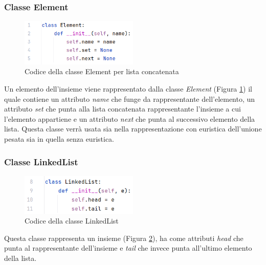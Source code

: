 \documentclass[12pt]{article}
\begin{document}
\subsubsection{Classe Element}
\begin{figure}[h]
    \centering
    \includegraphics[width=0.5\textwidth]{images/linked_list_code_images/ll_element.png}
    \caption{Codice della classe Element per lista concatenata}
    \label{fig:ll_element}
\end{figure}
Un elemento dell'insieme viene rappresentato dalla classe \textit{Element} (Figura \ref{fig:ll_element}) il quale contiene un attributo \textit{name} che funge da rappresentante dell'elemento, un attributo \textit{set} che punta alla lista concatenata rappresentante l'insieme a cui l'elemento appartiene e un attributo \textit{next} che punta al successivo elemento della lista.
Questa classe verrà usata sia nella rappresentazione con euristica dell'unione pesata sia in quella senza euristica.

\subsubsection{Classe LinkedList}
\begin{figure}[h]
    \centering
    \includegraphics[width=0.5\textwidth]{images/linked_list_code_images/ll_class.png}
    \caption{Codice della classe LinkedList}
    \label{fig:ll_class}
\end{figure}
Questa classe rappresenta un insieme (Figura \ref{fig:ll_class}), ha come attributi \textit{head} che punta al rappresentante dell'insieme e \textit{tail} che invece punta all'ultimo elemento della lista.
\end{document}
